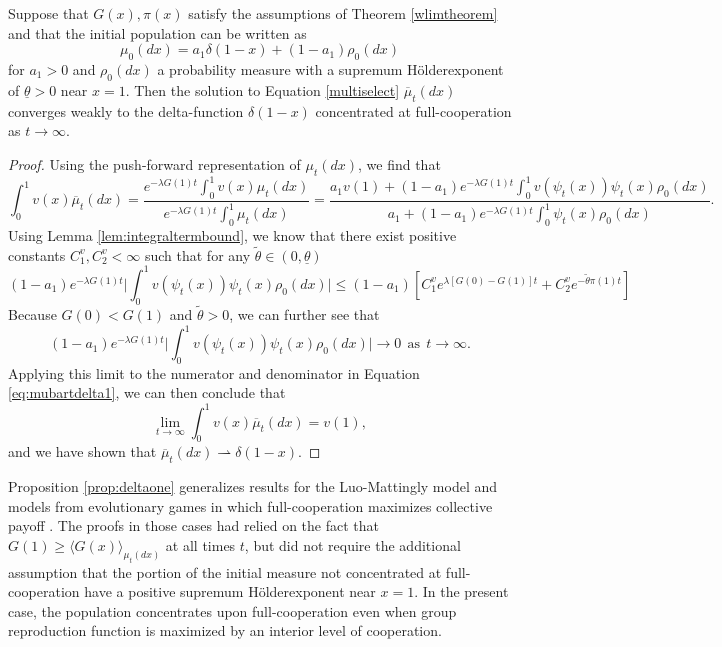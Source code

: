 \documentclass[11pt]{article}
\numberwithin{equation}{section}
\newcommand{\ds}{\displaystyle}
\newcommand{\ol}{\overline}
\newcommand{\holder}{H{\"o}lder\:}
\begin{document}
{\begin{proposition} \label{prop:deltaone}
Suppose that $G(x), \pi(x)$ satisfy the assumptions of Theorem \ref{wlimtheorem} and that the initial population can be written as 
\begin{equation} \label{eq:interiordelta1}
\mu_0(dx) = a_1 \delta(1-x) + \left( 1 - a_1 \right) \rho_0(dx)
\end{equation}
for $a_1 > 0$ and $\rho_0(dx)$ a probability measure with a supremum \holder exponent of $\underline{\theta} > 0$ near $x = 1$. Then the solution to Equation \eqref{multiselect} $\ol{\mu}_t(dx)$ converges weakly to the delta-function $\delta(1-x)$ concentrated at full-cooperation as $t \to \infty$. 
\end{proposition}

%
\begin{proof} %
 Using the push-forward representation of $\mu_t(dx)$, we find that
 \begin{dmath} \label{eq:mubartdelta1}
    \int_0^1 v(x) \ol{\mu}_t(dx) = \frac{e^{-\lambda G(1) t} \int_0^1 v(x) \mu_t(dx) }{e^{-\lambda G(1) t} \int_0^1 \mu_t(dx)} = \frac{a_1 v(1) + \left(1 - a_1\right) e^{-\lambda G(1) t} \int_0^1 v(\psi_t(x)) \psi_t(x) \rho_0(dx) }{a_1  + \left(1 - a_1\right) e^{-\lambda G(1) t} \int_0^1  \psi_t(x) \rho_0(dx)}.
 \end{dmath}
 Using Lemma \ref{lem:integraltermbound}, we know that there exist positive constants $C_1^v,C_2^v < \infty$ such that for any $\tilde{\theta} \in (0,\underline{\theta})$
 \[ \left(1 - a_1\right) e^{-\lambda G(1) t} \bigg|\int_0^1 v(\psi_t(x)) \psi_t(x) \rho_0(dx)\bigg| \leq \left(1-a_1\right) \left[ C_1^v e^{\lambda \left[G(0) - G(1) \right] t} + C_2^v e^{-\tilde{\theta} \pi(1) t} \right]
 \]
 Because $G(0) < G(1)$ and $\tilde{\theta} > 0$, we can further see that 
 \[ \left(1 - a_1\right) e^{-\lambda G(1) t} \bigg|\int_0^1 v(\psi_t(x)) \psi_t(x) \rho_0(dx)\bigg| \to 0 \: \: \mathrm{as} \: \: t \to \infty. \]
 Applying this limit to the numerator and denominator in Equation \ref{eq:mubartdelta1}, we can then conclude that
 \begin{equation}
     \ds\lim_{t \to \infty} \int_0^1 v(x) \ol{\mu}_t(dx) = v(1),
 \end{equation}
 and we have shown that $\ol{\mu}_t(dx) \rightharpoonup \delta(1-x)$. 
\end{proof}

\begin{remark}
Proposition \ref{prop:deltaone} generalizes results for the Luo-Mattingly model and models from evolutionary games in which full-cooperation maximizes collective payoff \cite{luo2017scaling,cooney2020pde}. The proofs in those cases had relied on the fact that $G(1) \geq \langle G(x)\rangle_  {\mu_t(dx)}$ at all times $t$, but did not require the additional assumption that the portion of the initial measure not concentrated at full-cooperation have a positive supremum \holder exponent near $x=1$. In the present case, the population concentrates upon full-cooperation even when group reproduction function is maximized by an interior level of cooperation. 
\end{remark}
 


}
\end{document}
